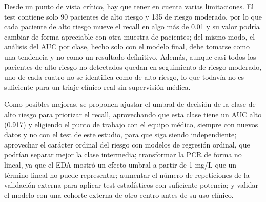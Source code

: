 \documentclass[journal,onecolumn]{IEEEtran}
\begin{document}
Desde un punto de vista crítico, hay que tener en cuenta varias limitaciones. El test contiene solo 90 pacientes de alto riesgo y 135 de riesgo moderado, por lo que cada paciente de alto riesgo mueve el recall en algo más de 0.01 y su valor podría cambiar de forma apreciable con otra muestra de pacientes; del mismo modo, el análisis del AUC por clase, hecho solo con el modelo final, debe tomarse como una tendencia y no como un resultado definitivo. Además, aunque casi todos los pacientes de alto riesgo no detectados quedan en seguimiento de riesgo moderado, uno de cada cuatro no se identifica como de alto riesgo, lo que todavía no es suficiente para un triaje clínico real sin supervisión médica.

Como posibles mejoras, se proponen ajustar el umbral de decisión de la clase de alto riesgo para priorizar el recall, aprovechando que esta clase tiene un AUC alto (0.917) y eligiendo el punto de trabajo con el equipo médico, siempre con nuevos datos y no con el test de este estudio, para que siga siendo independiente; aprovechar el carácter ordinal del riesgo con modelos de regresión ordinal, que podrían separar mejor la clase intermedia; transformar la PCR de forma no lineal, ya que el EDA mostró un efecto umbral a partir de 1 mg/L que un término lineal no puede representar; aumentar el número de repeticiones de la validación externa para aplicar test estadísticos con suficiente potencia; y validar el modelo con una cohorte externa de otro centro antes de su uso clínico.

\nocite{*}


\end{document}
